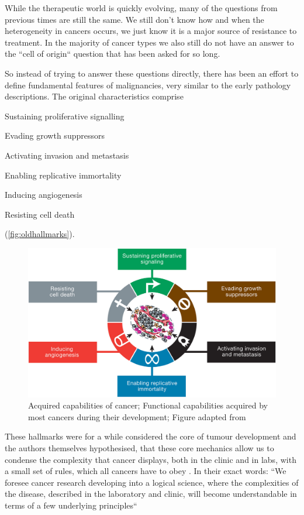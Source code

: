 While the therapeutic world is quickly evolving, many of the questions from previous times are still the same. We still don't know how and when the heterogeneity in cancers occurs, we just know it is a major source of resistance to treatment. In the majority of cancer types we also still do not have an answer to the ``cell of origin`` question that has been asked for so long.


So instead of trying to answer these questions directly, there has been an effort to define fundamental features of malignancies, very similar to the early pathology descriptions.  The original characteristics comprise 
\begin{enumerate*}
	\item Sustaining proliferative signalling
	\item Evading growth suppressors
	\item Activating invasion and metastasis
	\item Enabling replicative immortality
	\item Inducing angiogenesis
	\item Resisting cell death
\end{enumerate*} (\autoref{fig:oldhallmarks}). 


\begin{figure}[hbtp]
\centering
\includegraphics[width=.9\linewidth]{Figures/intro/oldHallmarksCancer.jpg}
\caption[Original hallmarks of cancer]{Acquired capabilities of cancer; Functional capabilities acquired by most cancers during their development; Figure adapted from \protect\textcite{Hanahan2000}}\label{fig:oldhallmarks}
\end{figure}



These hallmarks were for a while considered the core of tumour development and the authors themselves hypothesised, that these core mechanics allow us to condense the complexity that cancer displays, both in the clinic and in labs, with a small set of rules, which all cancers have to obey \cite{Hanahan2000}. In their exact words: ``We foresee cancer research developing into a logical science, where the complexities of the disease, described in the laboratory and clinic, will become understandable in terms of a few underlying principles``

